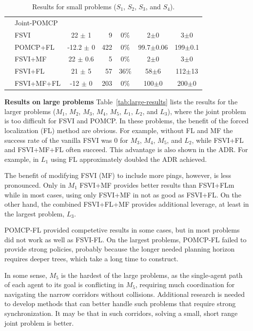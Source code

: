 \documentclass[letterpaper]{article}
\newcommand{\itay}[1]{}
\begin{document}
\begin{table}
{\begin{tabular}{ |c|l|c|r|c|c|c| }
& Joint-POMCP &&&&& \\
& FSVI\itay{+} & 22 $\pm$ 1 & 9 & 0\% & 2$\pm$0 & 3$\pm$0 \\
& POMCP+FL\itay{+} & -12.2 $\pm$ 0 & 422 & 0\% & 99.7$\pm$0.06 & 199$\pm$0.1 \\
& FSVI+MF\itay{+} & 22 $\pm$ 0.6 & 5 & 0\% &  2$\pm$0 & 3$\pm$0 \\
&FSVI+FL\itay{+} & 21 $\pm$ 5 & 57 & 36\% & 58$\pm$6 & 112$\pm$13 \\
& FSVI+MF+FL\itay{+} & -12 $\pm$ 0 & 203 & 0\% &  100$\pm$0 & 200$\pm$0 \\
\hline
\hline
\end{tabular}
}
\caption{Results for small problems ($S_1$, $S_2$, $S_3$, and $S_4$).\itay{** Average run-time in 200 runs}}
\label{tab:2small-results}
\end{table}




\noindent\textbf{Results on large problems}
Table~\ref{tab:large-results} lists the results for the larger problems ($M_1$, $M_2$, $M_3$, $M_4$, $M_5$, $L_1$, $L_2$, and $L_3$), where the joint problem is too difficult for FSVI and POMCP.
In these problems, the benefit of the forced localization (FL) method are obvious.
For example, without FL and MF the success rate of the vanilla FSVI was 0 for $M_3$, $M_4$, $M_5$, and $L_2$, while
FSVI+FL and FSVI+MF+FL often succeed. This advantage is also shown in the ADR.
For example, in $L_1$ using FL approximately doubled the ADR achieved.


The benefit of modifying FSVI (MF) to include more pings, however, is less pronounced. Only in $M_1$ FSVI+MF provides better results than FSVI+FLm while in most cases, using only FSVI+MF in not as good as FSVI+FL. On the other hand, the combined FSVI+FL+MF provides additional leverage, at least in the largest problem, $L_3$.

POMCP-FL provided competetive results in some cases, but in most problems did not work as well as FSVI-FL. On the largest problems, POMCP-FL failed to provide strong policies, probably because the longer needed planning horizon requires deeper trees, which take a long time to construct.

In some sense, $M_5$ is the hardest of the large problems, as the single-agent path of each agent to its goal is conflicting in $M_5$, requiring much coordination for navigating the narrow corridors without collisions.
Additional research is needed to develop methods that can better handle such problems that require strong synchronization. It may be that in such corridors, solving a small, short range joint problem is better.
\end{document}
